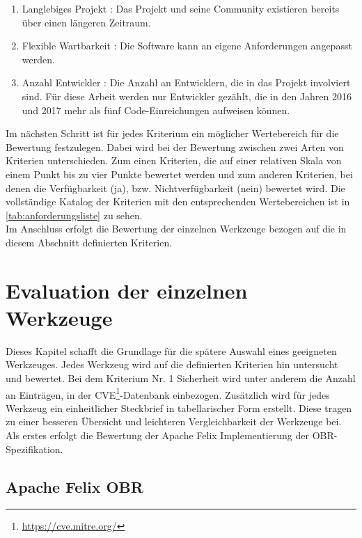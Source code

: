 \begin{enumerate}[label={Nr. \arabic*}, leftmargin=*, labelindent=1em]
 \item Langlebiges Projekt \cite{evaluation_criteria}: Das Projekt und seine Community existieren bereits über einen längeren Zeitraum.
 
 \item Flexible Wartbarkeit \cite{evaluation_criteria}: Die Software kann an eigene Anforderungen angepasst werden.
 
 \item Anzahl Entwickler \cite{evaluation_criteria}: Die Anzahl an Entwicklern, die in das Projekt involviert sind. Für diese Arbeit werden nur Entwickler 
 gezählt, die in den Jahren 2016 und 2017 mehr als fünf Code-Einreichungen aufweisen können.
\end{enumerate}

Im nächsten Schritt ist für jedes Kriterium ein möglicher Wertebereich für die Bewertung festzulegen.
Dabei wird bei der Bewertung zwischen zwei Arten von Kriterien unterschieden.
Zum einen Kriterien, die auf einer relativen Skala von einem Punkt bis zu vier Punkte bewertet werden und
zum anderen Kriterien, bei denen die Verfügbarkeit (ja), bzw. Nichtverfügbarkeit (nein) bewertet wird. 
Die vollständige Katalog der Kriterien mit den entsprechenden Wertebereichen ist in \autoref{tab:anforderungsliste} zu sehen.\\



Im Anschluss erfolgt die Bewertung der einzelnen Werkzeuge bezogen auf die in diesem Abschnitt definierten Kriterien.

\section{Evaluation der einzelnen Werkzeuge}
\label{sec:rating}

Dieses Kapitel schafft die Grundlage für die spätere Auswahl eines geeigneten Werkzeuges. Jedes Werkzeug wird 
auf die definierten Kriterien hin untersucht und bewertet. Bei dem Kriterium Nr. 1 Sicherheit wird 
unter anderem die Anzahl an Einträgen, in der \ac{CVE}\footnote{\url{https://cve.mitre.org/}}-Datenbank einbezogen.
Zusätzlich wird für jedes Werkzeug ein einheitlicher Steckbrief in tabellarischer Form erstellt. Diese tragen 
zu einer besseren Übersicht und leichteren Vergleichbarkeit der Werkzeuge bei. 
Als erstes erfolgt die Bewertung der Apache Felix Implementierung der \ac{OBR}-Spezifikation.

\subsection{Apache Felix OBR}

